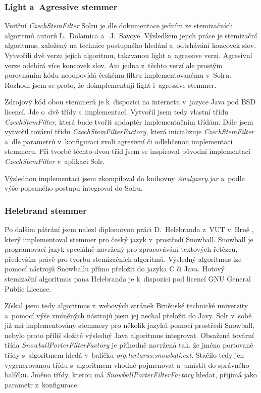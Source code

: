 \subsubsection{Light a~Agressive stemmer}
Vnitřní \emph{CzechStemFilter} Solru je dle dokumentace jedním ze stemizačních algoritmů autorů L.~Dolamica a~	J.~Savoye. Výsledkem jejich práce \cite{Dolamic:2009:Stemming} je stemizační algoritmus, založený na technice postupného hledání a~odtrhávání koncovek slov. Vytvořili dvě verze jejich algoritmu, takzvanou light a~agressive verzi. Agresivní verze odebírá více koncovek slov. Ani jedna z~těchto verzí ale prostým porovnáním kódu neodpovídá českému filtru implementovanému v~Solru. Rozhodl jsem se proto, že doimplementuji light i~agressive stemmer.

Zdrojový kód obou stemmerů je k~dispozici na internetu v~jazyce Java pod BSD licencí. Jde o~dvě třídy s~implementací. Vytvořil jsem tedy vlastní třídu \emph{CzechStemFilter}, která bude tvořit apdaptér implementačním třídám. Dále jsem vytvořil tovární třídu \emph{CzechStemFilterFactory}, která inicializuje \emph{CzechStemFilter} a~dle parametrů v~konfiguraci zvolí agresivní či odlehčenou implementaci stemmeru. Při tvorbě těchto dvou tříd jsem se inspiroval původní implementací \emph{CzechStemFilter} v~aplikaci Solr.

Výslednou implementaci jsem zkompiloval do knihovny \emph{Analyzery.jar} a~podle výše popsaného postupu integroval do Solru.

\subsubsection{Helebrand stemmer}
Po dalším pátrání jsem nalezl diplomovou práci D.~Helebranda z~VUT v~Brně \cite{Helebrand:2010:Stemming}, který implementoval stemmer pro český jazyk v~prostředí Snowball. Snowball je programovací jazyk speciálně navržený pro zpracovávání textových řetězců, především právě pro tvorbu stemizačních algoritmů. Výsledný algoritmus lze pomocí nástrojů Snowballu přímo přeložit do jazyka C či Java. Hotový stemizační algoritmus pana Helebranda je k~dispozici pod licencí GNU General Public License.

Získal jsem tedy algoritmus z~webových stránek Brněnské technické univerzity a~pomocí výše zmíněných nástrojů jsem jej nechal přeložit do Javy. Solr v~sobě již má implementovány stemmery pro několik jazyků pomocí prostředí Snowball, nebylo proto příliš složité výsledný Java algoritmus integrovat. Obsažená tovární třída \emph{SnowballPorterFilterFactory} je příhodně navržená tak, že jméno  portované třídy s~algoritmem hledá v~balíčku \emph{org.tartarus.snowball.ext}. Stačilo tedy jen vygenerovanou třídu s~algoritmem vhodně pojmenovat a~umístit do správného balíčku. Jméno třídy, kterou má \emph{SnowballPorterFilterFactory} hledat, přijímá jako parametr z~konfigurace.

